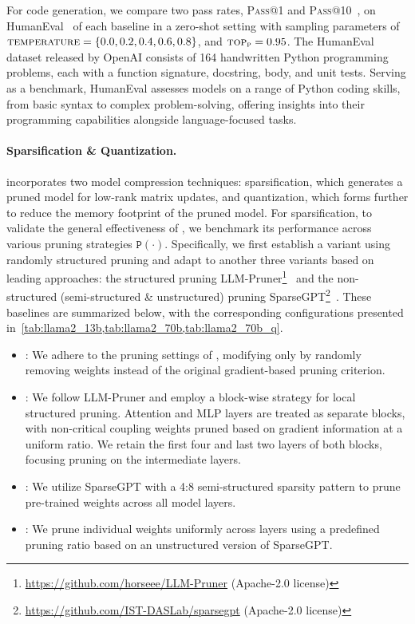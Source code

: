 For code generation, we compare two pass rates, \textsc{Pass@1} and \textsc{Pass@10}~\citep{kulal2019spoc}, on HumanEval~\citep{chen2021evaluating} of each baseline in a zero-shot setting with sampling parameters of  $\textsc{temperature}=\{0.0,0.2,0.4,0.6,0.8\}$, and $\textsc{top}_\textsc{p} =0.95$.
The HumanEval dataset released by OpenAI consists of 164 handwritten Python programming problems, each with a function signature, docstring, body, and unit tests. Serving as a benchmark, HumanEval assesses models on a range of Python coding skills, from basic syntax to complex problem-solving, offering insights into their programming capabilities alongside language-focused tasks.

\paragraph{Sparsification \& Quantization.}
\method incorporates two model compression techniques: sparsification, which generates a pruned model for low-rank matrix updates, and quantization, which forms \Qmethod further to reduce the memory footprint of the pruned model.
For sparsification, 
to validate the general effectiveness of \method, we benchmark its performance across various pruning strategies $\mathtt{P}(\cdot)$. 
Specifically, we first establish a variant using randomly structured pruning and adapt \method to another three variants based on leading approaches: the structured pruning LLM-Pruner\footnote{\url{https://github.com/horseee/LLM-Pruner} (Apache-2.0 license)}~\citep{ma2023llmpruner} and the non-structured (semi-structured \& unstructured) pruning SparseGPT\footnote{\url{https://github.com/IST-DASLab/sparsegpt} (Apache-2.0 license)}~\citep{FrantarA23spasegpt}. 
These baselines are summarized below, with the corresponding configurations presented in~\cref{tab:llama2_13b,tab:llama2_70b,tab:llama2_70b_q}.
\begin{itemize}[leftmargin=20pt]
    \item \textbf{\methodrand}: 
    We adhere to the pruning settings of \methodstru, modifying only by randomly removing weights instead of the original gradient-based pruning criterion.
    \item \textbf{\methodstru}: 
    We follow LLM-Pruner and employ a block-wise strategy for local structured pruning. Attention and MLP layers are treated as separate blocks, with non-critical coupling weights pruned based on gradient information at a uniform ratio. We retain the first four and last two layers of both blocks, focusing pruning on the intermediate layers.
    \item \textbf{\methodsemi}: 
    We utilize SparseGPT with a 4:8 semi-structured sparsity pattern to prune pre-trained weights across all model layers.
    \item \textbf{\methodunst}:  
    We prune individual weights uniformly across layers using a predefined pruning ratio based on an unstructured version of SparseGPT.
\end{itemize}

